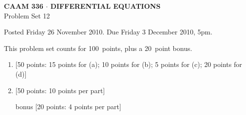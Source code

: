 \documentclass[10pt]{article}
\begin{document}
\begin{center}
\large \textsf{\textbf{CAAM 336 $\cdot$ DIFFERENTIAL EQUATIONS}\\[0.5em]
 Problem Set 12 }
\end{center}

Posted Friday 26 November 2010.  Due Friday 3 December 2010, 5pm.

\begin{center}
This problem set counts for 100~points, plus a 20~point bonus.\\
\end{center}


\begin{enumerate}
\item {[50 points: 15 points for (a); 10 points for (b); 5 points for (c); 20 points for (d)]}\\ 

\item {[50 points: 10 points per part]}\\ 
\newpage

\item[bonus] {[20 points: 4 points per part]}\\ 
\end{enumerate}
\end{document}
